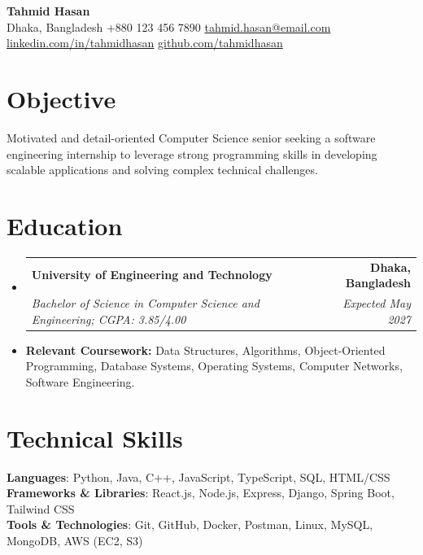 \documentclass[11pt,a4paper]{article}
\newcommand{\resumeSubheading}[4]{
  \vspace{-2pt}\item
    \begin{tabularx}{\linewidth}{X r}
      \textbf{#1} & \textbf{\small #2} \\
      \textit{\small#3} & \textit{\small #4} \\
    \end{tabularx}\vspace{-7pt}
}
\newcommand{\resumeSubHeadingListStart}{\begin{itemize}[leftmargin=0.0in, label={}]}
\newcommand{\resumeSubHeadingListEnd}{\end{itemize}\vspace{-4pt}}
\begin{document}
\begin{center}
    {\Huge \bfseries Tahmid Hasan} \\ \vspace{4pt}
    \small \color{darkgray}
    \faMapMarker* \enspace Dhaka, Bangladesh \quad
    \faPhone \enspace +880 123 456 7890 \quad
    \faEnvelope \enspace \href{mailto:tahmid.hasan@email.com}{tahmid.hasan@email.com} \quad
    \faLinkedin \enspace \href{https://linkedin.com/in/tahmidhasan}{linkedin.com/in/tahmidhasan} \quad
    \faGithub \enspace \href{https://github.com/tahmidhasan}{github.com/tahmidhasan}
\end{center}
\vspace{-12pt}

\section*{Objective}
\small \RaggedRight
Motivated and detail-oriented Computer Science senior seeking a software engineering internship to leverage strong programming skills in developing scalable applications and solving complex technical challenges.

\section*{Education}
\resumeSubHeadingListStart
  \resumeSubheading
    {University of Engineering and Technology}{Dhaka, Bangladesh}
    {Bachelor of Science in Computer Science and Engineering; CGPA: 3.85/4.00}{Expected May 2027}
    \vspace{2pt}
    \item \small \textbf{Relevant Coursework:} Data Structures, Algorithms, Object-Oriented Programming, Database Systems, Operating Systems, Computer Networks, Software Engineering.
\resumeSubHeadingListEnd

\section*{Technical Skills}
\begin{itemize}[leftmargin=0.0in, label={}, itemsep=1pt]
    \small{\item{
     \textbf{Languages}{: Python, Java, C++, JavaScript, TypeScript, SQL, HTML/CSS} \\
     \textbf{Frameworks \& Libraries}{: React.js, Node.js, Express, Django, Spring Boot, Tailwind CSS} \\
     \textbf{Tools \& Technologies}{: Git, GitHub, Docker, Postman, Linux, MySQL, MongoDB, AWS (EC2, S3)}
    }}
\end{itemize}
\vspace{-10pt}
\end{document}
